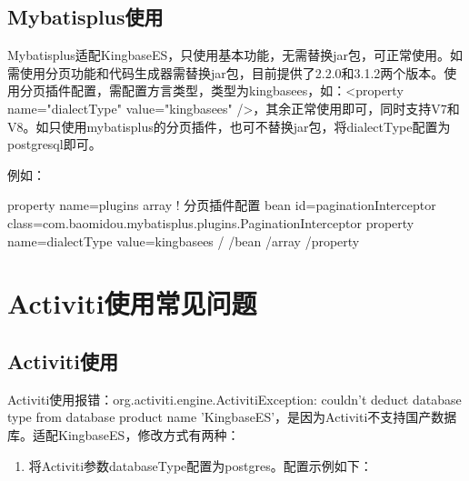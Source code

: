 \documentclass[a4,10pt,oneside,english]{sphinxmanual}
\begin{document}
\subsection{Mybatis\sphinxhyphen{}plus使用}
\label{\detokenize{interface/mybatis-plus:id1}}
Mybatis\sphinxhyphen{}plus适配KingbaseES，只使用基本功能，无需替换jar包，可正常使用。如需使用分页功能和代码生成器需替换jar包，目前提供了2.2.0和3.1.2两个版本。使用分页插件配置，需配置方言类型，类型为kingbasees，如：<property name="dialectType" value="kingbasees" />，其余正常使用即可，同时支持V7和V8。如只使用mybatis\sphinxhyphen{}plus的分页插件，也可不替换jar包，将dialectType配置为postgresql即可。

例如：

\begin{sphinxVerbatim}[commandchars=\\\{\}]
\PYGZlt{}property name=\PYGZdq{}plugins\PYGZdq{}\PYGZgt{}
         \PYGZlt{}array\PYGZgt{}
                   \PYGZlt{}!\PYGZhy{}\PYGZhy{} 分页插件配置 \PYGZhy{}\PYGZhy{}\PYGZgt{}
                   \PYGZlt{}bean id=\PYGZdq{}paginationInterceptor\PYGZdq{}
                                              class=\PYGZdq{}com.baomidou.mybatisplus.plugins.PaginationInterceptor\PYGZdq{}\PYGZgt{}
                            \PYGZlt{}property name=\PYGZdq{}dialectType\PYGZdq{} value=\PYGZdq{}kingbasees\PYGZdq{} /\PYGZgt{}
                   \PYGZlt{}/bean\PYGZgt{}
         \PYGZlt{}/array\PYGZgt{}
\PYGZlt{}/property\PYGZgt{}
\end{sphinxVerbatim}


\section{Activiti使用常见问题}
\label{\detokenize{interface/activiti:activiti}}\label{\detokenize{interface/activiti::doc}}

\subsection{Activiti使用}
\label{\detokenize{interface/activiti:id1}}
Activiti使用报错：org.activiti.engine.ActivitiException: couldn't deduct database type from database product name 'KingbaseES'，是因为Activiti不支持国产数据库。适配KingbaseES，修改方式有两种：
\begin{enumerate}
%
\item {} 
将Activiti参数databaseType配置为postgres。配置示例如下：

\end{enumerate}
\end{document}
